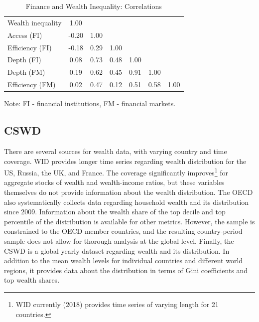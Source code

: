 \begin{refsection}
%
%
\begin{table}[ht!]
\small
\centering
\caption{Finance and Wealth Inequality: Correlations}
\label{ch3tab:corrmat}
\begin{threeparttable}
\begin{tabular}{lcccccc}
  \toprule
  Wealth inequality & 1.00 &  & & & & \\
  Access (FI)  & -0.20 & 1.00 &  & & &    \\ 
  Efficiency (FI) & -0.18 & 0.29 & 1.00 & & &  \\ 
  Depth (FI)  & 0.08 & 0.73 & 0.48 & 1.00 &  &   \\ 
  Depth (FM)  & 0.19 & 0.62 & 0.45 & 0.91 & 1.00 &   \\ 
  Efficiency (FM)  & 0.02 & 0.47 & 0.12 & 0.51 & 0.58 & 1.00   \\ 
  \bottomrule
\end{tabular}
\begin{tablenotes}
\small
\item Note: FI - financial institutions, FM - financial markets.
\end{tablenotes}
\end{threeparttable}
\end{table}
%
%

\subsection{\ac{CSWD}}\label{ch3subsec:cswd}
There are several sources for wealth data, with varying country and time coverage. \ac{WID} provides longer time series regarding wealth distribution for the \ac{US}, Russia, the \ac{UK}, and France. The coverage significantly improves\footnote{\ac{WID} currently (2018) provides time series of varying length for 21 countries.} for aggregate stocks of wealth and wealth-income ratios, but these variables themselves do not provide information about the wealth distribution. The \ac{OECD} also systematically collects data regarding household wealth and its distribution since 2009. Information about the wealth share of the top decile and top percentile of the distribution is available for other metrics. However, the sample is constrained to the \ac{OECD} member countries, and the resulting country-period sample does not allow for thorough analysis at the global level. Finally, the \ac{CSWD} is a global yearly dataset regarding wealth and its distribution. In addition to the mean wealth levels for individual countries and different world regions, it provides data about the distribution in terms of Gini coefficients and top wealth shares.


\end{refsection}

